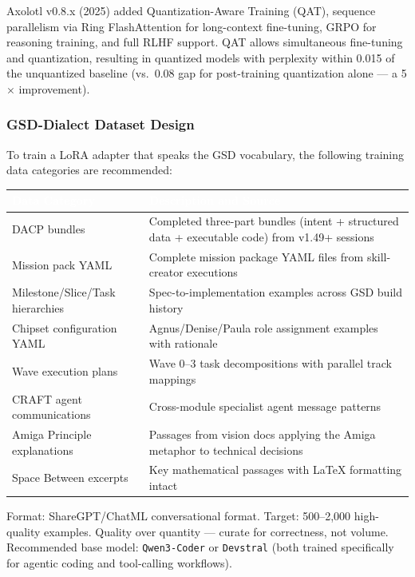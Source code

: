 \documentclass[11pt,letterpaper]{article}
\newcommand{\tableheader}[1]{\textbf{\sffamily\textcolor{white}{#1}}}
\begin{document}
Axolotl v0.8.x (2025) added Quantization-Aware Training (QAT), sequence parallelism via Ring FlashAttention for long-context fine-tuning, GRPO for reasoning training, and full RLHF support. QAT allows simultaneous fine-tuning and quantization, resulting in quantized models with perplexity within 0.015 of the unquantized baseline (vs.\ 0.08 gap for post-training quantization alone --- a 5$\times$ improvement).

\subsubsection{GSD-Dialect Dataset Design}

To train a LoRA adapter that speaks the GSD vocabulary, the following training data categories are recommended:

\begin{center}
\begin{tabularx}{\textwidth}{L{3.5cm}X}
\toprule
{}
\tableheader{Data Category} & \tableheader{Description and Source} \\
\midrule
DACP bundles & Completed three-part bundles (intent + structured data + executable code) from v1.49+ sessions \\
Mission pack YAML & Complete mission package YAML files from skill-creator executions \\
Milestone/Slice/Task hierarchies & Spec-to-implementation examples across GSD build history \\
Chipset configuration YAML & Agnus/Denise/Paula role assignment examples with rationale \\
Wave execution plans & Wave 0--3 task decompositions with parallel track mappings \\
CRAFT agent communications & Cross-module specialist agent message patterns \\
Amiga Principle explanations & Passages from vision docs applying the Amiga metaphor to technical decisions \\
Space Between excerpts & Key mathematical passages with LaTeX formatting intact \\
\bottomrule
\end{tabularx}
\end{center}

Format: ShareGPT/ChatML conversational format. Target: 500--2,000 high-quality examples. Quality over quantity --- curate for correctness, not volume. Recommended base model: \texttt{Qwen3-Coder} or \texttt{Devstral} (both trained specifically for agentic coding and tool-calling workflows).
\end{document}
